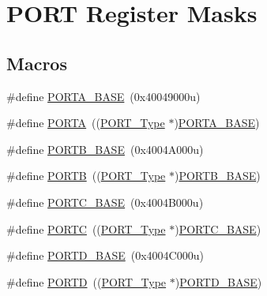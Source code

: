 \hypertarget{group___p_o_r_t___register___masks}{}\section{P\+O\+RT Register Masks}
\label{group___p_o_r_t___register___masks}
\subsection*{Macros}
\begin{DoxyCompactItemize}
\item 
\#define \mbox{\hyperlink{group___p_o_r_t___register___masks_gae3d20f730f9619aabbf94e2efd1de34c}{P\+O\+R\+T\+A\+\_\+\+B\+A\+SE}}~(0x40049000u)
\item 
\#define \mbox{\hyperlink{group___p_o_r_t___register___masks_ga7c8a7f98a98d8cb125dd57a66720ab30}{P\+O\+R\+TA}}~((\mbox{\hyperlink{struct_p_o_r_t___type}{P\+O\+R\+T\+\_\+\+Type}} $\ast$)\mbox{\hyperlink{group___p_o_r_t___register___masks_gae3d20f730f9619aabbf94e2efd1de34c}{P\+O\+R\+T\+A\+\_\+\+B\+A\+SE}})
\item 
\#define \mbox{\hyperlink{group___p_o_r_t___register___masks_ga2a668049a5e6c09cf6a7164ffca38a7e}{P\+O\+R\+T\+B\+\_\+\+B\+A\+SE}}~(0x4004\+A000u)
\item 
\#define \mbox{\hyperlink{group___p_o_r_t___register___masks_ga09a0c85cd3da09d9cdf63a5ac4c39f77}{P\+O\+R\+TB}}~((\mbox{\hyperlink{struct_p_o_r_t___type}{P\+O\+R\+T\+\_\+\+Type}} $\ast$)\mbox{\hyperlink{group___p_o_r_t___register___masks_ga2a668049a5e6c09cf6a7164ffca38a7e}{P\+O\+R\+T\+B\+\_\+\+B\+A\+SE}})
\item 
\#define \mbox{\hyperlink{group___p_o_r_t___register___masks_ga0018f0edf7f8030868f9cc791275378d}{P\+O\+R\+T\+C\+\_\+\+B\+A\+SE}}~(0x4004\+B000u)
\item 
\#define \mbox{\hyperlink{group___p_o_r_t___register___masks_ga68fea88642279a70246e026e7221b0a5}{P\+O\+R\+TC}}~((\mbox{\hyperlink{struct_p_o_r_t___type}{P\+O\+R\+T\+\_\+\+Type}} $\ast$)\mbox{\hyperlink{group___p_o_r_t___register___masks_ga0018f0edf7f8030868f9cc791275378d}{P\+O\+R\+T\+C\+\_\+\+B\+A\+SE}})
\item 
\#define \mbox{\hyperlink{group___p_o_r_t___register___masks_gab88c980d0129f396683260eb978daf15}{P\+O\+R\+T\+D\+\_\+\+B\+A\+SE}}~(0x4004\+C000u)
\item 
\#define \mbox{\hyperlink{group___p_o_r_t___register___masks_ga3e6a2517db4f9cb7c9037adf0aefe79b}{P\+O\+R\+TD}}~((\mbox{\hyperlink{struct_p_o_r_t___type}{P\+O\+R\+T\+\_\+\+Type}} $\ast$)\mbox{\hyperlink{group___p_o_r_t___register___masks_gab88c980d0129f396683260eb978daf15}{P\+O\+R\+T\+D\+\_\+\+B\+A\+SE}})

\end{DoxyCompactItemize}
